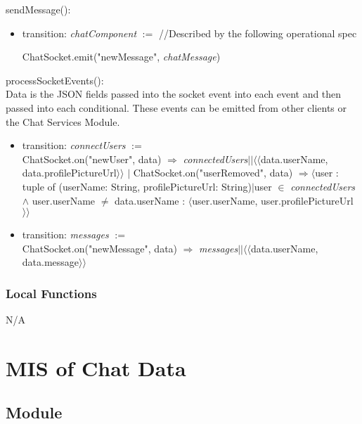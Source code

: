 \documentclass[12pt, titlepage]{article}
\begin{document}
	\noindent sendMessage():
	\begin{itemize}
		\item transition: \textit{chatComponent} $:=$ //Described by the following operational spec 
		
		ChatSocket.emit("newMessage",  \textit{chatMessage})
	\end{itemize}
	
	\noindent processSocketEvents():\\
	
	\noindent Data is the JSON fields passed into the socket event into each event and then passed into each conditional. These events can be emitted from other clients or the Chat Services Module.
	
	\begin{itemize}
		
		\item transition: \textit{connectUsers} $:=$ \\
		ChatSocket.on("newUser", data) $\Rightarrow$ \textit{connectedUsers}$|| \langle \langle$data.userName, data.profilePictureUrl$\rangle \rangle$ $|$ ChatSocket.on("userRemoved", data) $\Rightarrow \langle$user : tuple of (userName: String, profilePictureUrl: String)$|$user $\in$ \textit{connectedUsers} $\land$ user.userName $\neq$ data.userName : $\langle$user.userName, user.profilePictureUrl$\rangle\rangle$
		
		\item transition: \textit{messages} $:=$ \\
		ChatSocket.on("newMessage", data) $\Rightarrow$ \textit{messages}$|| \langle \langle$data.userName, data.message$\rangle \rangle$
	\end{itemize}
	
	\subsubsection{Local Functions}
	
	N/A
	
	\newpage
	
	\section{MIS of Chat Data} \label{Module}
	
	\subsection{Module}
	
\end{document}
